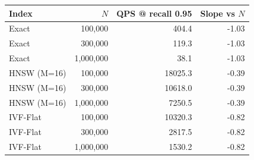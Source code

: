 \begin{tabular}{lrrr}
\toprule
Index & $N$ & QPS @ recall 0.95 & Slope vs $N$ \\
\midrule
Exact & 100,000 & 404.4 & -1.03 \\
Exact & 300,000 & 119.3 & -1.03 \\
Exact & 1,000,000 & 38.1 & -1.03 \\
HNSW (M=16) & 100,000 & 18025.3 & -0.39 \\
HNSW (M=16) & 300,000 & 10618.0 & -0.39 \\
HNSW (M=16) & 1,000,000 & 7250.5 & -0.39 \\
IVF-Flat & 100,000 & 10320.3 & -0.82 \\
IVF-Flat & 300,000 & 2817.5 & -0.82 \\
IVF-Flat & 1,000,000 & 1530.2 & -0.82 \\
\bottomrule
\end{tabular}
